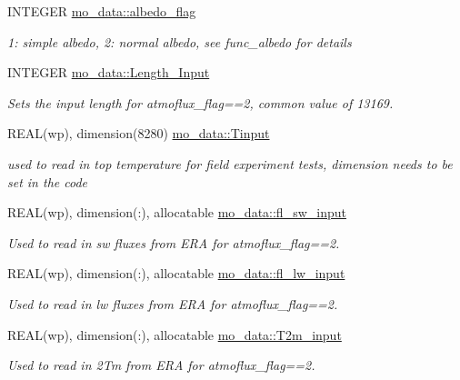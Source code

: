 \begin{DoxyCompactItemize}
INTEGER \hyperlink{namespacemo__data_a503f12cf2d0684ad5423b92e37c97fbe}{mo\_\-data::albedo\_\-flag}
\begin{DoxyCompactList}\small\item\em 1: simple albedo, 2: normal albedo, see func\_\-albedo for details \item\end{DoxyCompactList}\item 
INTEGER \hyperlink{namespacemo__data_a9a0ff39379f1d347bcb323cd49cb222e}{mo\_\-data::Length\_\-Input}
\begin{DoxyCompactList}\small\item\em Sets the input length for atmoflux\_\-flag==2, common value of 13169. \item\end{DoxyCompactList}\item 
REAL(wp), dimension(8280) \hyperlink{namespacemo__data_a05dff3e3a302bd2f751263140d8f367b}{mo\_\-data::Tinput}
\begin{DoxyCompactList}\small\item\em used to read in top temperature for field experiment tests, dimension needs to be set in the code \item\end{DoxyCompactList}\item 
REAL(wp), dimension(:), allocatable \hyperlink{namespacemo__data_adbae909d2ce614966d3de6ae1eb558a0}{mo\_\-data::fl\_\-sw\_\-input}
\begin{DoxyCompactList}\small\item\em Used to read in sw fluxes from ERA for atmoflux\_\-flag==2. \item\end{DoxyCompactList}\item 
REAL(wp), dimension(:), allocatable \hyperlink{namespacemo__data_a2d2ccb1188895b74eb3e2742c6a82b4c}{mo\_\-data::fl\_\-lw\_\-input}
\begin{DoxyCompactList}\small\item\em Used to read in lw fluxes from ERA for atmoflux\_\-flag==2. \item\end{DoxyCompactList}\item 
REAL(wp), dimension(:), allocatable \hyperlink{namespacemo__data_a8795a47a232696bffa9fa64a1f06a420}{mo\_\-data::T2m\_\-input}
\begin{DoxyCompactList}\small\item\em Used to read in 2Tm from ERA for atmoflux\_\-flag==2. \item\end{DoxyCompactList}\item 

\end{DoxyCompactItemize}
